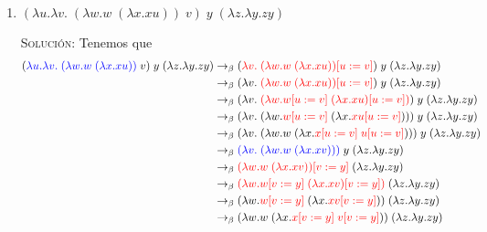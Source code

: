 \documentclass[letterpaper,11pt]{article}
\begin{document}
\begin{enumerate}
\begin{enumerate}
        \item $(\lambda u. \lambda v. \; (\lambda w.w \; (\lambda x.xu)) \; v) 
        \; y \; (\lambda z. \lambda y.zy)$

        \textsc{Solución:} Tenemos que 
        \begin{align*}
            (\textcolor{blue}{\lambda u. \lambda v. \; (\lambda w.w \; 
                                                       (\lambda x.xu))} \; v) 
            \; y \; (\lambda z. \lambda y.zy)
            &\rightarrow_{\beta}
            (\textcolor{red}{\lambda v. \; (\lambda w.w \; (\lambda x.xu))
                             [u := v]}) \; y \; (\lambda z. \lambda y.zy) \\
            &\rightarrow_{\beta}
            (\lambda v. \; \textcolor{red}{(\lambda w.w \; (\lambda x.xu))
            [u := v]}) \; y \; (\lambda z. \lambda y.zy) \\
            &\rightarrow_{\beta} 
            (\lambda v. \; \textcolor{red}{(\lambda w.w [u := v] \; 
            (\lambda x.xu) [u := v])}) \; y \; (\lambda z. \lambda y.zy) \\
            &\rightarrow_{\beta} 
            (\lambda v. \; (\lambda w. \textcolor{red}{w [u := v]} \;
            (\lambda x. \textcolor{red}{xu [u := v]}))) \; y \; 
            (\lambda z. \lambda y.zy) \\
            &\rightarrow_{\beta}
            (\lambda v. \; (\lambda w.w \; (\lambda x. 
            \textcolor{red}{x[u := v] \; u[u := v]}))) \; y \; 
            (\lambda z. \lambda y.zy) \\
            &\rightarrow_{\beta}
            \textcolor{blue}{(\lambda v. \; (\lambda w.w \; (\lambda x.xv)))}
            \; y \; (\lambda z. \lambda y.zy) \\
            &\rightarrow_{\beta}
            \textcolor{red}{(\lambda w.w \; (\lambda x.xv)) [v := y]}
            \; (\lambda z. \lambda y.zy) \\
            &\rightarrow_{\beta}
            \textcolor{red}{(\lambda w.w [v := y] \; (\lambda x.xv) [v := y])}
            \; (\lambda z. \lambda y.zy) \\
            &\rightarrow_{\beta}
            (\lambda w. \textcolor{red}{w [v := y]} \; (\lambda x.
            \textcolor{red}{xv [v := y]})) \; (\lambda z. \lambda y.zy) \\
            &\rightarrow_{\beta}
            (\lambda w.w \; (\lambda x. 
            \textcolor{red}{x [v := y] \; v [v := y]}))
            \; (\lambda z. \lambda y.zy) \\

\end{align*}
\end{enumerate}
\end{enumerate}
\end{document}
